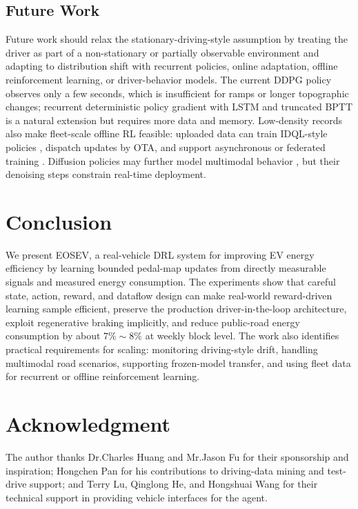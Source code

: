 \documentclass[conference]{IEEEtran}
\begin{document}
\subsection{Future Work}\label{sec:future_work}

Future work should relax the stationary-driving-style assumption by treating the driver as part of a non-stationary or partially observable environment and adapting to distribution shift with recurrent policies, online adaptation, offline reinforcement learning, or driver-behavior models. The current DDPG policy observes only a few seconds, which is insufficient for ramps or longer topographic changes; recurrent deterministic policy gradient with LSTM and truncated BPTT \parencite{heess15:_memor,Hochreiter_1997,sutskever2013training,chollet2015keras} is a natural extension but requires more data and memory. Low-density records also make fleet-scale offline RL feasible: uploaded data can train IDQL-style policies \parencite{hansen-estruch23:_idql}, dispatch updates by OTA, and support asynchronous or federated training \parencite{mnih16:_async_method_deep_reinf_learn,konečný15:_feder_optim}. Diffusion policies may further model multimodal behavior \parencite{janner22:_plann_diffus_flexib_behav_synth,wang22:_diffus_polic_expres_polic_class,psenka23:_learn_diffus_model_polic_rewar}, but their denoising steps constrain real-time deployment.

\section{Conclusion}\label{sec:conclusion}

We present EOSEV, a real-vehicle DRL system for improving EV energy efficiency by learning bounded pedal-map updates from directly measurable signals and measured energy consumption. The experiments show that careful state, action, reward, and dataflow design can make real-world reward-driven learning sample efficient, preserve the production driver-in-the-loop architecture, exploit regenerative braking implicitly, and reduce public-road energy consumption by about $7\%\sim8\%$ at weekly block level. The work also identifies practical requirements for scaling: monitoring driving-style drift, handling multimodal road scenarios, supporting frozen-model transfer, and using fleet data for recurrent or offline reinforcement learning.
\section*{Acknowledgment}

The author thanks Dr.\@ Charles Huang and Mr.\@ Jason Fu for their sponsorship and inspiration; Hongchen Pan for his contributions to driving-data mining and test-drive support; and Terry Lu, Qinglong He, and Hongshuai Wang for their technical support in providing vehicle interfaces for the agent.

\printbibliography
\end{document}

